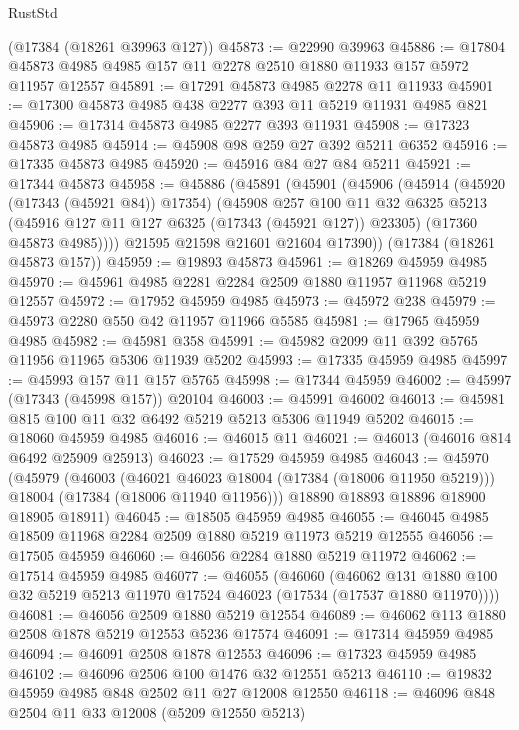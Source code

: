 \begin{lexlean}{RustStd}
\begin{coremodule}
    (@17384 (@18261 @39963 @127))
@45873 := @22990 @39963
@45886 := @17804 @45873 @4985 @4985 @157 @11 @2278 @2510 @1880 @11933 @157 @5972 @11957 @12557
@45891 := @17291 @45873 @4985 @2278 @11 @11933
@45901 := @17300 @45873 @4985 @438 @2277 @393 @11 @5219 @11931 @4985 @821
@45906 := @17314 @45873 @4985 @2277 @393 @11931
@45908 := @17323 @45873 @4985
@45914 := @45908 @98 @259 @27 @392 @5211 @6352
@45916 := @17335 @45873 @4985
@45920 := @45916 @84 @27 @84 @5211
@45921 := @17344 @45873
@45958 := @45886
    (@45891
      (@45901
        (@45906
          (@45914
            (@45920 (@17343 (@45921 @84)) @17354)
            (@45908
              @257
              @100
              @11
              @32
              @6325
              @5213
              (@45916 @127 @11 @127 @6325 (@17343 (@45921 @127)) @23305)
              (@17360 @45873 @4985))))
        @21595
        @21598
        @21601
        @21604
        @17390))
    (@17384 (@18261 @45873 @157))
@45959 := @19893 @45873
@45961 := @18269 @45959 @4985
@45970 := @45961 @4985 @2281 @2284 @2509 @1880 @11957 @11968 @5219 @12557
@45972 := @17952 @45959 @4985
@45973 := @45972 @238
@45979 := @45973 @2280 @550 @42 @11957 @11966 @5585
@45981 := @17965 @45959 @4985
@45982 := @45981 @358
@45991 := @45982 @2099 @11 @392 @5765 @11956 @11965 @5306 @11939 @5202
@45993 := @17335 @45959 @4985
@45997 := @45993 @157 @11 @157 @5765
@45998 := @17344 @45959
@46002 := @45997 (@17343 (@45998 @157)) @20104
@46003 := @45991 @46002
@46013 := @45981 @815 @100 @11 @32 @6492 @5219 @5213 @5306 @11949 @5202
@46015 := @18060 @45959 @4985
@46016 := @46015 @11
@46021 := @46013 (@46016 @814 @6492 @25909 @25913)
@46023 := @17529 @45959 @4985
@46043 := @45970
    (@45979
      (@46003
        (@46021 @46023 @18004 (@17384 (@18006 @11950 @5219)))
        @18004
        (@17384 (@18006 @11940 @11956)))
      @18890
      @18893
      @18896
      @18900
      @18905
      @18911)
@46045 := @18505 @45959 @4985
@46055 := @46045 @4985 @18509 @11968 @2284 @2509 @1880 @5219 @11973 @5219 @12555
@46056 := @17505 @45959
@46060 := @46056 @2284 @1880 @5219 @11972
@46062 := @17514 @45959 @4985
@46077 := @46055
    (@46060
      (@46062 @131 @1880 @100 @32 @5219 @5213 @11970 @17524 @46023 (@17534 (@17537 @1880 @11970))))
@46081 := @46056 @2509 @1880 @5219 @12554
@46089 := @46062 @113 @1880 @2508 @1878 @5219 @12553 @5236 @17574
@46091 := @17314 @45959 @4985
@46094 := @46091 @2508 @1878 @12553
@46096 := @17323 @45959 @4985
@46102 := @46096 @2506 @100 @1476 @32 @12551 @5213
@46110 := @19832 @45959 @4985 @848 @2502 @11 @27 @12008 @12550
@46118 := @46096 @848 @2504 @11 @33 @12008 (@5209 @12550 @5213)

\end{coremodule}
\end{lexlean}
